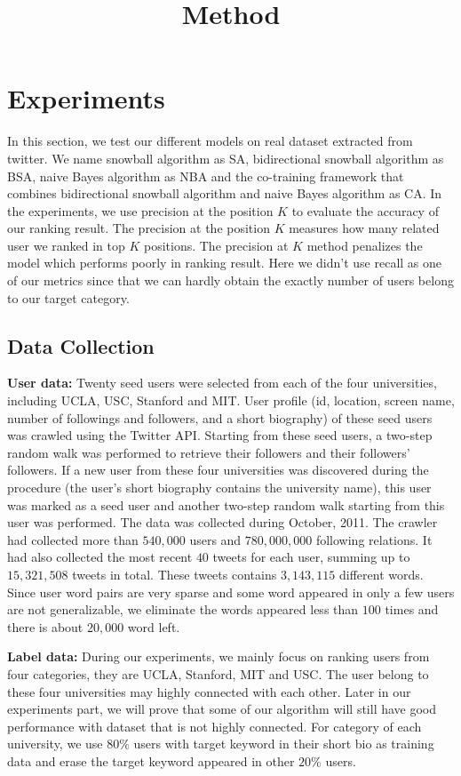 \documentclass{article}
\begin{document}
\title{Method}
\maketitle \else \fi

\section{Experiments}\label{sec:experiment}
In this section, we test our different models on real dataset extracted from twitter. We name snowball algorithm as SA, bidirectional snowball algorithm as BSA, naive Bayes algorithm as NBA and the co-training framework that combines bidirectional snowball algorithm and naive Bayes algorithm as CA. In the experiments, we use precision at the position $K$ to evaluate the accuracy of our ranking result. The precision at the position $K$ measures how many related user we ranked in top $K$ positions. The precision at $K$ method penalizes the model which performs poorly in ranking result. Here we didn't use recall as one of our metrics since that we can hardly obtain the exactly number of users belong to our target category.

\subsection{Data Collection}
\textbf{User data:} Twenty seed users were selected from each of the four universities, including UCLA, USC, Stanford and MIT. User profile (id, location, screen name, number of followings and followers, and a short biography) of these seed users was crawled using the Twitter API. Starting from these seed users, a two-step random walk was performed to retrieve their followers and their followers' followers. If a new user from these four universities was discovered during the procedure (the user's short biography contains the university name), this user was marked as a seed user and another two-step random walk starting from this user was performed. The data was collected during October, 2011. The crawler had collected more than $540,000$ users and $780,000,000$ following relations. It had also collected the most recent $40$ tweets for each user, summing up to $15,321,508$ tweets in total. These tweets contains $3,143,115$ different words. Since user word pairs are very sparse and some word appeared in only a few users are not generalizable, we eliminate the words appeared less than $100$ times and there is about $20,000$ word left.

\textbf{Label data:} During our experiments, we mainly focus on ranking users from four categories, they are UCLA, Stanford, MIT and USC. The user belong to these four universities may highly connected with each other. Later in our experiments part, we will prove that some of our algorithm will still have good performance with dataset that is not highly connected. For category of each university, we use $80\%$ users with target keyword in their short bio as training data and erase the target keyword appeared in other $20\%$ users.
\end{document}

